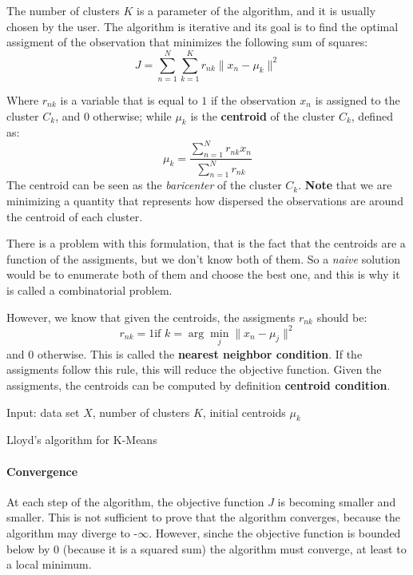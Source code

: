 The number of clusters $K$ is a parameter of the algorithm, and it is usually chosen by the user. The algorithm is iterative and its goal is to find the optimal assigment of the observation that minimizes the following sum of squares:
\[
    J = \sum_{n=1}^{N} \sum_{k=1}^K r_{nk} \|x_n - \mu_k\|^2
\]

Where $r_{nk}$ is a variable that is equal to $1$ if the observation $x_n$ is assigned to the cluster $C_k$, and $0$ otherwise; while $\mu_k$ is the \textbf{centroid} of the cluster $C_k$, defined as:
\[
    \mu_k = \frac{\sum_{n=1}^{N} r_{nk} x_n}{\sum_{n=1}^{N} r_{nk}}
\]
The centroid can be seen as the \textit{baricenter} of the cluster $C_k$. \textbf{Note} that we are minimizing a quantity that represents how dispersed the observations are around the centroid of each cluster.

There is a problem with this formulation, that is the fact that the centroids are a function of the assigments, but we don't know both of them. So a \textit{naive} solution would be to enumerate both of them and choose the best one, and this is why it is called a combinatorial problem.

However, we know that given the centroids, the assigments $r_{nk}$ should be:
\[
    r_{nk} = 1 \text{if } k = \arg\min_{j} \|x_n - \mu_j\|^2
\]
and $0$ otherwise. This is called the \textbf{nearest neighbor condition}. If the assigments follow this rule, this will reduce the objective function. Given the assigments, the centroids can be computed by definition \textbf{centroid condition}.

\begin{algorithm}
    \SetAlgoLined
    Input: data set $X$, number of clusters $K$, initial centroids $\mu_k$ \\
    \caption{Lloyd's algorithm for K-Means}
\end{algorithm}


\paragraph*{Convergence}
At each step of the algorithm, the objective function $J$ is becoming smaller and smaller. This is not sufficient to prove that the algorithm converges, because the algorithm may diverge to -$\infty$. However, sinche the objective function is bounded below by $0$ (because it is a squared sum) the algorithm must converge, at least to a local minimum.

